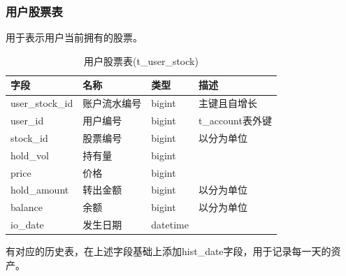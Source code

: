 \documentclass{article}
\begin{document}
\subsubsection{用户股票表}
用于表示用户当前拥有的股票。
\begin{table}[h]
    \caption{用户股票表(t\_user\_stock)}
    \label{t000005}
    \begin{tabular}{|p{2cm}|p{3cm}|p{2cm}|p{5cm}|} \hline
        字段 & 名称 & 类型 & 描述 \\ \hline 
        user\_stock\_id & 账户流水编号 & bigint & 主键且自增长 \\ \hline
        user\_id & 用户编号 & bigint & t\_account表外键 \\ \hline
        stock\_id & 股票编号 & bigint & 以分为单位 \\ \hline
        hold\_vol & 持有量 & bigint & \\ \hline
        price & 价格 & bigint & \\ \hline
        hold\_amount & 转出金额 & bigint & 以分为单位 \\ \hline
        balance & 余额 & bigint & 以分为单位  \\ \hline
        io\_date & 发生日期 & datetime & \\ \hline
    \end{tabular}
\end{table}
有对应的历史表，在上述字段基础上添加hist\_date字段，用于记录每一天的资产。
\end{document}
